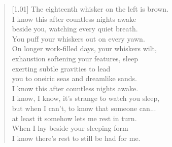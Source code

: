 \begin{verse}[1.01\textwidth]
The eighteenth whisker on the left is brown.\\
\vin I know this after countless nights awake\\
beside you, watching every quiet breath.\\
\vin You puff your whiskers out on every yawn.\\
On longer work-filled days, your whiskers wilt,\\
\vin exhaustion softening your features, sleep\\
exerting subtle gravities to lead\\
\vin you to oneiric seas and dreamlike sands.\\
I know this after countless nights awake.\\
\vin I know, I know, it's strange to watch you sleep,\\
but when I can't, to know that someone can...\\
\vin at least it somehow lets me rest in turn.\\
When I lay beside your sleeping form\\
\vin I know there's rest to still be had for me.
\end{verse}
